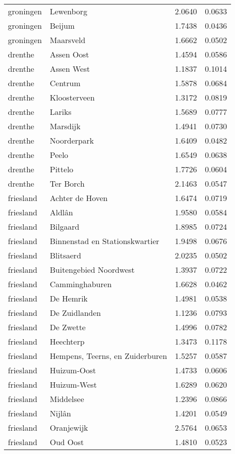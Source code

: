 \begin{longtable}{llcc}
groningen & Lewenborg & 2.0640 & 0.0633 \\
groningen & Beijum & 1.7438 & 0.0436 \\
groningen & Maarsveld & 1.6662 & 0.0502 \\
drenthe & Assen Oost & 1.4594 & 0.0586 \\
drenthe & Assen West & 1.1837 & 0.1014 \\
drenthe & Centrum & 1.5878 & 0.0684 \\
drenthe & Kloosterveen & 1.3172 & 0.0819 \\
drenthe & Lariks & 1.5689 & 0.0777 \\
drenthe & Marsdijk & 1.4941 & 0.0730 \\
drenthe & Noorderpark & 1.6409 & 0.0482 \\
drenthe & Peelo & 1.6549 & 0.0638 \\
drenthe & Pittelo & 1.7726 & 0.0604 \\
drenthe & Ter Borch & 2.1463 & 0.0547 \\
friesland & Achter de Hoven & 1.6474 & 0.0719 \\
friesland & Aldlân & 1.9580 & 0.0584 \\
friesland & Bilgaard & 1.8985 & 0.0724 \\
friesland & Binnenstad en Stationskwartier & 1.9498 & 0.0676 \\
friesland & Blitsaerd & 2.0235 & 0.0502 \\
friesland & Buitengebied Noordwest & 1.3937 & 0.0722 \\
friesland & Camminghaburen & 1.6628 & 0.0462 \\
friesland & De Hemrik & 1.4981 & 0.0538 \\
friesland & De Zuidlanden & 1.1236 & 0.0793 \\
friesland & De Zwette & 1.4996 & 0.0782 \\
friesland & Heechterp & 1.3473 & 0.1178 \\
friesland & Hempens, Teerns, en Zuiderburen & 1.5257 & 0.0587 \\
friesland & Huizum-Oost & 1.4733 & 0.0606 \\
friesland & Huizum-West & 1.6289 & 0.0620 \\
friesland & Middelsee & 1.2396 & 0.0866 \\
friesland & Nijlân & 1.4201 & 0.0549 \\
friesland & Oranjewijk & 2.5764 & 0.0653 \\
friesland & Oud Oost & 1.4810 & 0.0523 \\

\end{longtable}
